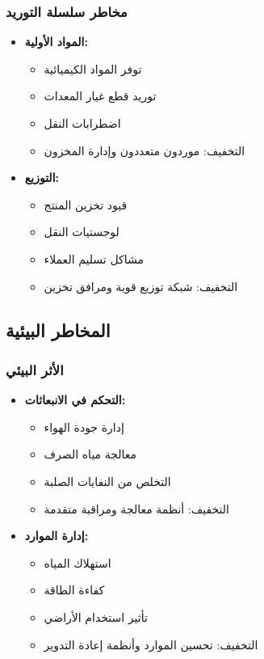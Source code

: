 \subsubsection{مخاطر سلسلة التوريد}
\begin{itemize}
    \item \textbf{المواد الأولية:}
    \begin{itemize}
        \item توفر المواد الكيميائية
        \item توريد قطع غيار المعدات
        \item اضطرابات النقل
        \item التخفيف: موردون متعددون وإدارة المخزون
    \end{itemize}
    
    \item \textbf{التوزيع:}
    \begin{itemize}
        \item قيود تخزين المنتج
        \item لوجستيات النقل
        \item مشاكل تسليم العملاء
        \item التخفيف: شبكة توزيع قوية ومرافق تخزين
    \end{itemize}
\end{itemize}

\subsection{المخاطر البيئية}

\subsubsection{الأثر البيئي}
\begin{itemize}
    \item \textbf{التحكم في الانبعاثات:}
    \begin{itemize}
        \item إدارة جودة الهواء
        \item معالجة مياه الصرف
        \item التخلص من النفايات الصلبة
        \item التخفيف: أنظمة معالجة ومراقبة متقدمة
    \end{itemize}
    
    \item \textbf{إدارة الموارد:}
    \begin{itemize}
        \item استهلاك المياه
        \item كفاءة الطاقة
        \item تأثير استخدام الأراضي
        \item التخفيف: تحسين الموارد وأنظمة إعادة التدوير
    \end{itemize}
\end{itemize}

